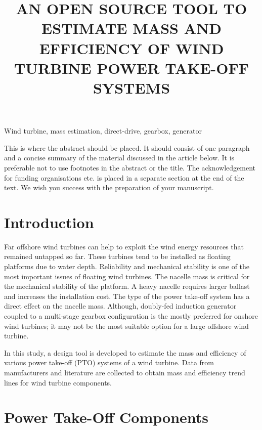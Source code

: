 \documentclass{article}
\begin{document}
\title{AN OPEN SOURCE TOOL TO ESTIMATE MASS AND EFFICIENCY OF WIND TURBINE POWER TAKE-OFF SYSTEMS}


\maketitle

\keywords
Wind turbine, mass estimation, direct-drive, gearbox, generator

\abstract
This is where the abstract should be placed. It should
consist of one paragraph and a concise summary of the
material discussed in the article below. It is preferable not
to use footnotes in the abstract or the title. The
acknowledgement for funding organisations etc. is placed
in a separate section at the end of the text. We wish you
success with the preparation of your manuscript.

\section{Introduction}

Far offshore wind turbines can help to exploit the wind energy resources that remained untapped so far. These turbines tend to be installed as floating platforms due to water depth. Reliability and mechanical stability is one of the most important issues of floating wind turbines. The nacelle mass is critical for the mechanical stability of the platform. A heavy nacelle requires larger ballast and increases the installation cost. The type of the power take-off system has a direct effect on the nacelle mass. Although, doubly-fed induction generator coupled to a multi-stage gearbox configuration is the mostly preferred for onshore wind turbines; it may not be the most suitable option for a large offshore wind turbine.


In this study, a design tool is developed to estimate the mass and efficiency of various power take-off (PTO) systems of a wind turbine. Data from manufacturers and literature are collected to obtain mass and efficiency trend lines for wind turbine components. 

\section{Power Take-Off Components}
\end{document}
